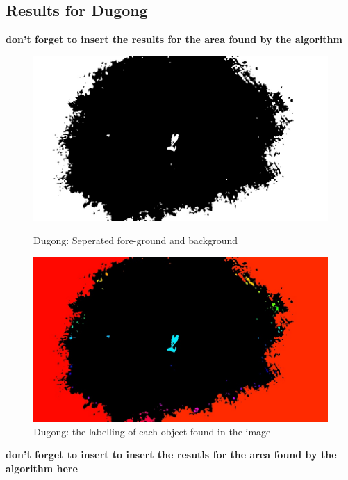 \documentclass[conference]{IEEEtran}
\begin{document}
\subsection{Results for Dugong}
\textbf{don't forget to insert the results for the area found by the algorithm}
\begin{figure}[!htb]
  \centering
  \begin{minipage}[b]{0.4\textwidth}
    \includegraphics[width=\textwidth]{../programme/results/Task_3/dugong/image_0.jpg}
    \caption{Dugong: Seperated fore-ground and background}
    \label{Dugong: Seperated fore-ground and background}
  \end{minipage}
  \hfill
  \begin{minipage}[b]{0.4\textwidth}
    \includegraphics[width=\textwidth]{../programme/results/Task_3/dugong/image_1.jpg}
    \caption{Dugong: the labelling of each object found in the image}
    \label{Dugong: the labelling of each object found in the image}
  \end{minipage}
\end{figure}

\textbf{don't forget to insert to insert the resutls for the area found by the algorithm here}
\end{document}
